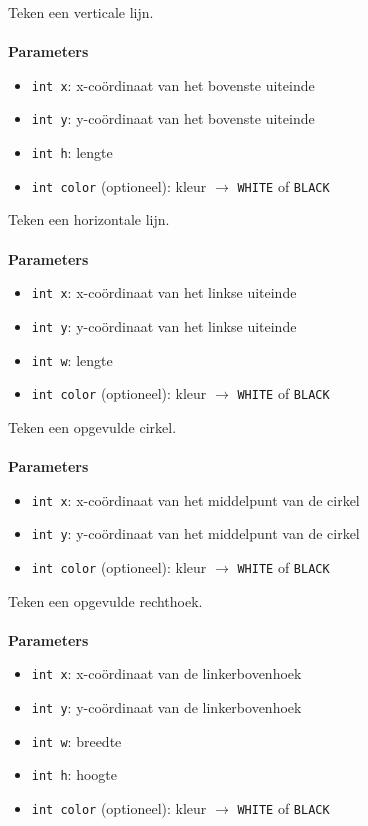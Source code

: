 \documentclass[11pt,fleqn]{book} %
\begin{document}
\begin{libf}[drawFastVLine(x, y, h, \emph{color=WHITE})]
	Teken een verticale lijn.\\ \\
	\textbf{Parameters}
	\begin{itemize}
		\item \texttt{int x}: x-coördinaat van het bovenste uiteinde
		\item \texttt{int y}: y-coördinaat van het bovenste uiteinde
		\item \texttt{int h}: lengte
		\item \texttt{int color} (optioneel): kleur $\rightarrow$ \texttt{WHITE} of \texttt{BLACK}
	\end{itemize}
\end{libf}

\begin{libf}[drawFastHLine(x, y, w, \emph{color=WHITE})]
	Teken een horizontale lijn.\\ \\
	\textbf{Parameters}
	\begin{itemize}
		\item \texttt{int x}: x-coördinaat van het linkse uiteinde
		\item \texttt{int y}: y-coördinaat van het linkse uiteinde
		\item \texttt{int w}: lengte
		\item \texttt{int color} (optioneel): kleur $\rightarrow$ \texttt{WHITE} of \texttt{BLACK}
	\end{itemize}
\end{libf}

\begin{libf}[fillCircle(x, y, r, \emph{color=WHITE})]
	Teken een opgevulde cirkel.\\ \\
	\textbf{Parameters}
	\begin{itemize}
		\item \texttt{int x}: x-coördinaat van het middelpunt van de cirkel
		\item \texttt{int y}: y-coördinaat van het middelpunt van de cirkel
		\item \texttt{int color} (optioneel): kleur $\rightarrow$ \texttt{WHITE} of \texttt{BLACK}
	\end{itemize}
\end{libf}

\begin{libf}[fillRect(x, y, w, h, \emph{color=WHITE})]
	Teken een opgevulde rechthoek.\\ \\
	\textbf{Parameters}
	\begin{itemize}
		\item \texttt{int x}: x-coördinaat van de linkerbovenhoek
		\item \texttt{int y}: y-coördinaat van de linkerbovenhoek
		\item \texttt{int w}: breedte
		\item \texttt{int h}: hoogte
		\item \texttt{int color} (optioneel): kleur $\rightarrow$ \texttt{WHITE} of \texttt{BLACK}
	\end{itemize}
\end{libf}
\end{document}
